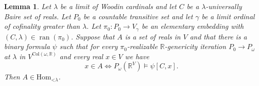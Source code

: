 \documentclass[fleqn, 11pt]{amsart}
\theoremstyle{plain}
\newtheorem{lem}[thm]{Lemma} \newtheorem*{lem*}{Lemma}
\theoremstyle{definition}
\theoremstyle{remark}
\newcommand{\Hom}{\mathrm{Hom}}
\newcommand{\Col}{\mathrm{Col}}
\DeclareMathOperator{\ran}{ran}
\begin{document}






\begin{lem}\label{lem-absolutely-definable}
 Let $\lambda$ be a limit of Woodin cardinals and let $C$ be a $\lambda$-universally Baire set of reals.
 Let $P_{0}$ be a countable transitive set and let $\gamma$ be a limit ordinal of cofinality greater than $\lambda$. Let $\pi_0 \colon P_0 \to V_{\gamma}$ be an elementary embedding with $(C,\lambda) \in \ran(\pi_0)$. Suppose that $A$ is a set of reals in $V$ and that there is a binary formula $\psi$ such that for every $\pi_0$-realizable $\mathbb{R}$-genericity iteration $P_0 \to P_\omega$ at $\lambda$ in $V^{\Col(\omega,\mathbb{R})}$ and every real $x \in V$ we have
 \[ x \in A \iff P_\omega(\mathbb{R}^V) \models \psi[C,x].\]
 Then $A \in \Hom_{\mathord{<}\lambda}$.
\end{lem}
\end{document}
